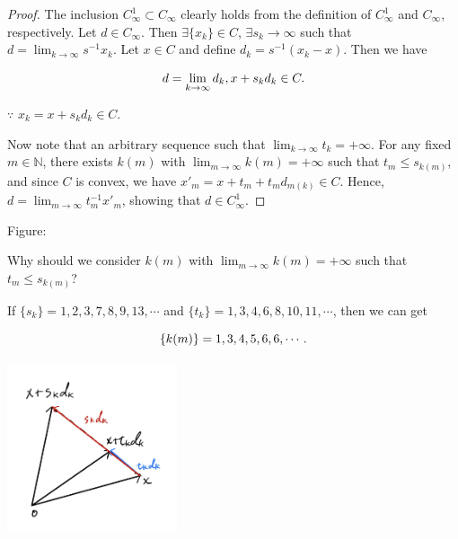 \documentclass[a4paper,11pt]{jsarticle}
\newcommand{\NaturalNumberSet}{\mathbb{N}}
\begin{document}
\begin{proof}
  The inclusion $C_{\infty}^{1} \subset C_{\infty}$ clearly holds from the definition of $C_{\infty}^{1}$ and $C_{\infty}$, respectively. Let $d \in C_{\infty}$. Then $\exists \{x_k\} \in C$, $\exists s_k \rightarrow \infty$ such that $d = \lim_{k \to \infty} s^{-1} x_k$. Let $x \in C$ and define $d_k = s^{-1}(x_k - x)$. Then we have

  \begin{equation}
    d = \lim_{k \to \infty} d_k, x + s_k d_k \in C. \notag
  \end{equation}

  $\because$ $x_k = x + s_k d_k \in C$.

  Now note that an arbitrary sequence such that $\lim_{k \to \infty} t_k = +\infty$. For any fixed $m \in \NaturalNumberSet$, there exists $k(m)$ with $\lim_{m \to \infty} k(m) = +\infty$ such that $t_m \leq s_{k(m)}$, and since $C$ is convex, we have $x'_m = x + t_m + t_m d_{m(k)} \in C$. Hence, $d = \lim_{m \to \infty} t_m^{-1} x'_m$, showing that $d \in C_{\infty}^1$.

\end{proof}

Figure:

Why should we consider $k(m)$ with $\lim_{m \to \infty} k(m) = +\infty$ such that $t_m \leq s_{k(m)}$?

If $\{s_k\} = 1,2,3,7,8,9,13, \cdots$ and $\{t_k\} = 1,3,4,6,8,10,11, \cdots$, then we can get

\begin{equation}
  \{k(m)\} = 1,3,4,5,6,6, \cdots. \notag
\end{equation}

\begin{center}
  \includegraphics[width=5cm]{figures/asymptotically_regular_associated_with_convex.png}
\end{center}
\end{document}

